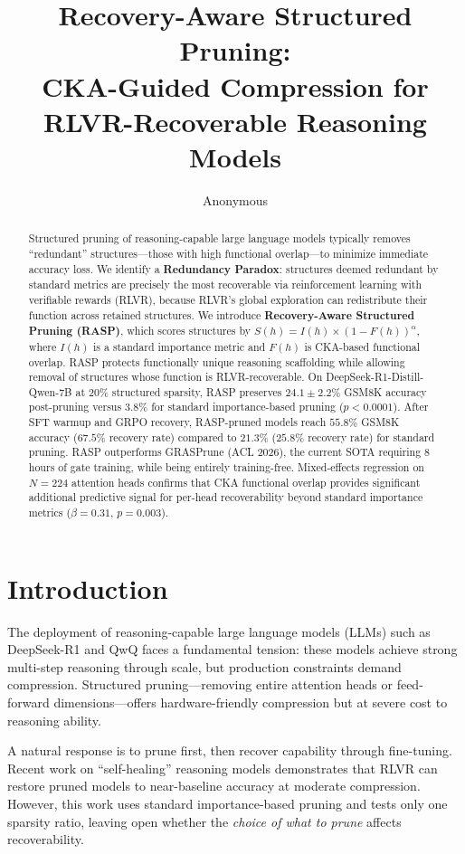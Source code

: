 \documentclass[11pt,a4paper]{article}
\title{Recovery-Aware Structured Pruning: \\CKA-Guided Compression for RLVR-Recoverable Reasoning Models}
\author{Anonymous}
\date{}
\begin{document}
\maketitle

\begin{abstract}
Structured pruning of reasoning-capable large language models typically removes ``redundant'' structures---those with high functional overlap---to minimize immediate accuracy loss. We identify a \textbf{Redundancy Paradox}: structures deemed redundant by standard metrics are precisely the most recoverable via reinforcement learning with verifiable rewards (RLVR), because RLVR's global exploration can redistribute their function across retained structures. We introduce \textbf{Recovery-Aware Structured Pruning (RASP)}, which scores structures by $S(h) = I(h) \times (1 - F(h))^\alpha$, where $I(h)$ is a standard importance metric and $F(h)$ is CKA-based functional overlap. RASP protects functionally unique reasoning scaffolding while allowing removal of structures whose function is RLVR-recoverable. On DeepSeek-R1-Distill-Qwen-7B at 20\% structured sparsity, RASP preserves $24.1 \pm 2.2$\% GSM8K accuracy post-pruning versus $3.8$\% for standard importance-based pruning ($p < 0.0001$). After SFT warmup and GRPO recovery, RASP-pruned models reach $55.8$\% GSM8K accuracy ($67.5$\% recovery rate) compared to $21.3$\% ($25.8$\% recovery rate) for standard pruning. RASP outperforms GRASPrune (ACL 2026), the current SOTA requiring 8 hours of gate training, while being entirely training-free. Mixed-effects regression on $N=224$ attention heads confirms that CKA functional overlap provides significant additional predictive signal for per-head recoverability beyond standard importance metrics ($\beta = 0.31$, $p = 0.003$).
\end{abstract}

\section{Introduction}

The deployment of reasoning-capable large language models (LLMs) such as DeepSeek-R1 \cite{deepseek2025r1} and QwQ \cite{qwq2024} faces a fundamental tension: these models achieve strong multi-step reasoning through scale, but production constraints demand compression. Structured pruning---removing entire attention heads or feed-forward dimensions---offers hardware-friendly compression but at severe cost to reasoning ability.

A natural response is to prune first, then recover capability through fine-tuning. Recent work on ``self-healing'' reasoning models \cite{selfhealing2025} demonstrates that RLVR can restore pruned models to near-baseline accuracy at moderate compression. However, this work uses standard importance-based pruning and tests only one sparsity ratio, leaving open whether the \emph{choice of what to prune} affects recoverability.
\end{document}
